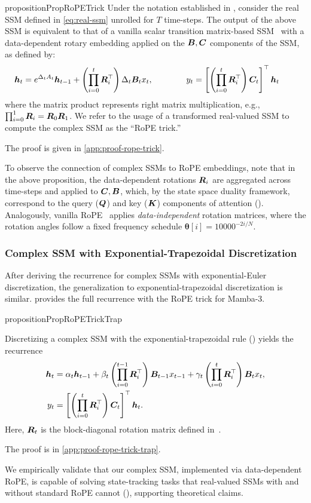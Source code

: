 \begin{restatable}{proposition}{PropRoPETrick}\label{prop:rope-trick} 
Under the notation established in , consider the real SSM defined in \eqref{eq:real-ssm} unrolled for $T$ time-steps.
The output of the above SSM is equivalent to that of a vanilla scalar transition matrix-based SSM~ with a data-dependent rotary embedding applied on the ${\bm{B}},{\bm{C}}$ components of the SSM, as defined by:
\begin{equation}
    {\bm{h}}_t = e^{\Delta_tA_t}{\bm{h}}_{t-1} + \left( \prod_{i=0}^t {\bm{R}}^\top_i \right) \Delta_t{\bm{B}}_tx_t, \qquad \qquad
    y_t = \left[\left( \prod_{i=0}^t {\bm{R}}^\top_i \right){\bm{C}}_t\right]^\top{\bm{h}}_t \qquad
\end{equation}
where the matrix product represents right matrix multiplication, e.g., $\prod_{i=0}^1{\bm{R}}_i = {\bm{R}}_0 {\bm{R}}_1$. 
We refer to the usage of a transformed real-valued SSM to compute the complex SSM as the ``RoPE trick.''
\end{restatable}
The proof is given in \cref{app:proof-rope-trick}.

To observe the connection of complex SSMs to RoPE embeddings, note that in the above proposition, the data-dependent rotations ${\bm{R}}_i$ are aggregated across time-steps and applied to ${\bm{C}},{\bm{B}}$, which, by the state space duality framework, correspond to the query (${\bm{Q}}$) and key (${\bm{K}}$) components of attention (). 
Analogously, vanilla RoPE~\citep{su2023roformerenhancedtransformerrotary} applies \emph{data-independent} rotation matrices, where the rotation angles follow a fixed frequency schedule $\boldsymbol{\theta}[i] = 10000^{-2i/N}$. 

\subsubsection{Complex SSM with Exponential-Trapezoidal Discretization}

After deriving the recurrence for complex SSMs with exponential-Euler discretization, the generalization to exponential-trapezoidal discretization is similar.
 provides the full recurrence with the RoPE trick for Mamba-3.

\begin{restatable}{proposition}{PropRoPETrickTrap}\label{prop:rope-trick-trap}

Discretizing a complex SSM with the exponential-trapezoidal rule () yields the recurrence
\begin{align}
    {\bm{h}}_t 
    &= \alpha_t {\bm{h}}_{t-1} 
    + \beta_t \left(\prod_{i=0}^{t-1} {\bm{R}}_i^\top \right){\bm{B}}_{t-1} x_{t-1} 
    + \gamma_t \left(\prod_{i=0}^t {\bm{R}}_i^\top \right){\bm{B}}_t x_t, \nonumber \\
    y_t
    &= \left[\left(\prod_{i=0}^t {\bm{R}}_i^\top\right){\bm{C}}_t\right]^\top {\bm{h}}_t .
\end{align}
Here, ${\bm{R}}_t$ is the block-diagonal rotation matrix defined in~.
\end{restatable}

The proof is in \cref{app:proof-rope-trick-trap}.

We empirically validate that our complex SSM, implemented via data-dependent RoPE, is capable of solving state-tracking tasks that real-valued SSMs with and without standard RoPE cannot (), supporting theoretical claims.
